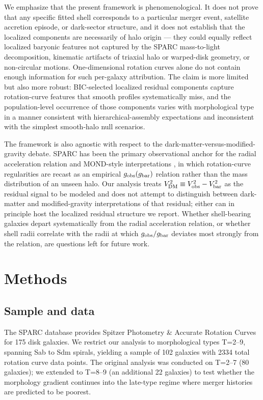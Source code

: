 We emphasize that the present framework is phenomenological. It does not prove that any specific fitted shell corresponds to a particular merger event, satellite accretion episode, or dark-sector structure, and it does not establish that the localized components are necessarily of halo origin --- they could equally reflect localized baryonic features not captured by the SPARC mass-to-light decomposition, kinematic artifacts of triaxial halo or warped-disk geometry, or non-circular motions. One-dimensional rotation curves alone do not contain enough information for such per-galaxy attribution. The claim is more limited but also more robust: BIC-selected localized residual components capture rotation-curve features that smooth profiles systematically miss, and the population-level occurrence of those components varies with morphological type in a manner consistent with hierarchical-assembly expectations and inconsistent with the simplest smooth-halo null scenarios.

The framework is also agnostic with respect to the dark-matter-versus-modified-gravity debate. SPARC has been the primary observational anchor for the radial acceleration relation and MOND-style interpretations \citep{McGaugh2016}, in which rotation-curve regularities are recast as an empirical $g_{\rm obs}(g_{\rm bar})$ relation rather than the mass distribution of an unseen halo. Our analysis treats $V^2_{\rm DM} \equiv V^2_{\rm obs} - V^2_{\rm bar}$ as the residual signal to be modeled and does not attempt to distinguish between dark-matter and modified-gravity interpretations of that residual; either can in principle host the localized residual structure we report. Whether shell-bearing galaxies depart systematically from the radial acceleration relation, or whether shell radii correlate with the radii at which $g_{\rm obs}/g_{\rm bar}$ deviates most strongly from the relation, are questions left for future work.

\section{Methods}
\label{sec:methods}

\subsection{Sample and data}
\label{sec:sample}

The SPARC database \citep{Lelli2016} provides Spitzer Photometry \& Accurate Rotation Curves for 175 disk galaxies. We restrict our analysis to morphological types T=2--9, spanning Sab to Sdm spirals, yielding a sample of 102 galaxies with 2334 total rotation curve data points. The original analysis was conducted on T=2--7 (80 galaxies); we extended to T=8--9 (an additional 22 galaxies) to test whether the morphology gradient continues into the late-type regime where merger histories are predicted to be poorest.

